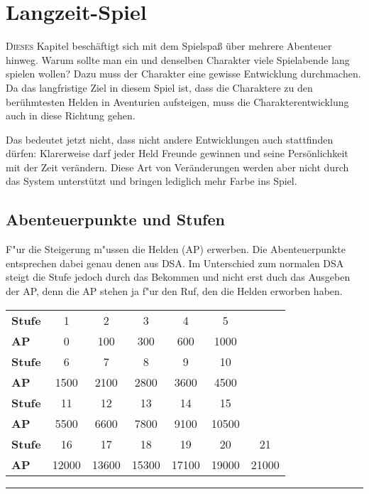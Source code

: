 \chapter{Langzeit-Spiel}\label{Ch:LangzeitSpiel}
\lettrine{D}{ieses} Kapitel beschäftigt sich mit dem Spielspaß über mehrere Abenteuer hinweg. Warum sollte man ein und denselben Charakter viele Spielabende lang spielen wollen? Dazu muss der Charakter eine gewisse Entwicklung durchmachen. Da das langfristige Ziel in diesem Spiel ist, dass die Charaktere zu den berühmtesten Helden in Aventurien aufsteigen, muss die Charakterentwicklung auch in diese Richtung gehen.

Das bedeutet jetzt nicht, dass nicht andere Entwicklungen auch stattfinden dürfen: Klarerweise darf jeder Held Freunde gewinnen und seine Persönlichkeit mit der Zeit verändern. Diese Art von Veränderungen werden aber nicht durch das System unterstützt und bringen lediglich mehr Farbe ins Spiel.

\section{Abenteuerpunkte und Stufen}
F"ur die Steigerung m"ussen die Helden  (AP) erwerben. Die Abenteuerpunkte entsprechen dabei genau denen aus DSA. Im Unterschied zum normalen DSA steigt die Stufe jedoch durch das Bekommen und nicht erst duch das Ausgeben der AP, denn die AP stehen ja f"ur den Ruf, den die Helden erworben haben.

\begin{table}
\begin{tabular}[C]{l*{6}c}
\bf Stufe & 1   & 2   & 3   & 4   & 5    \\
\bf AP    & 0   & 100 & 300 & 600 & 1000 \\[\medskipamount]
\bf Stufe & 6   & 7   & 8   & 9   & 10  \\
\bf AP    & 1500& 2100& 2800& 3600& 4500\\[\medskipamount]
\bf Stufe & 11  & 12  & 13  & 14  & 15  \\
\bf AP    & 5500& 6600& 7800& 9100&10500\\[\medskipamount]
\bf Stufe & 16  & 17  & 18  & 19  & 20   & 21 \\
\bf AP    & 12000&13600&15300&17100&19000& 21000
\end{tabular}
\medskip
\hrule
\end{table}

